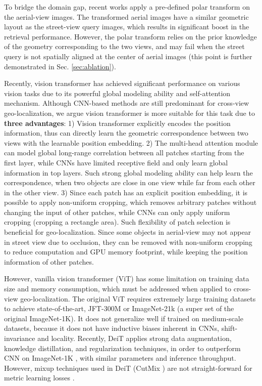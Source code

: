 \documentclass[10pt,twocolumn,letterpaper]{article}
\begin{document}
To bridge the domain gap, recent works apply a pre-defined polar transform \cite{SAFA,shi2020looking,toker2021coming} on the aerial-view images. The transformed aerial images have a similar geometric layout as the street-view query images, which results in significant boost in the retrieval performance. However, the polar transform relies on the prior knowledge of the geometry corresponding to the two views, and may fail when the street query is not spatially aligned at the center of aerial images \cite{zhu2021vigor} (this point is further demonstrated in Sec. \ref{sec:ablation}). 

Recently, vision transformer \cite{vit} has achieved significant performance on various vision tasks due to its powerful global modeling ability and self-attention mechanism. Although CNN-based methods are still predominant for cross-view geo-localization, we argue vision transformer is more suitable for this task due to \textbf{three advantages}: 1) Vision transformer explicitly encodes the position information, thus can directly learn the geometric correspondence between two views with the learnable position embedding. 2) The multi-head attention \cite{transformer} module can model global long-range correlation between all patches starting from the first layer, while CNNs have limited receptive field \cite{vit} and only learn global information in top layers. Such strong global modeling ability can help learn the correspondence, when two objects are close in one view while far from each other in the other view. 3) Since each patch has an explicit position embedding, it is possible to apply non-uniform cropping, which removes arbitrary patches without changing the input of other patches, while CNNs can only apply uniform cropping (\ie cropping a rectangle area). Such flexibility of patch selection is beneficial for geo-localization. Since some objects in aerial-view may not appear in street view due to occlusion, they can be removed with non-uniform cropping to reduce computation and GPU memory footprint, while keeping the position information of other patches.

However, vanilla vision transformer \cite{vit} (ViT) has some limitation on training data size and memory consumption, which must be addressed when applied to cross-view geo-localization. The original ViT \cite{vit} requires extremely large training datasets to achieve state-of-the-art, \eg JFT-300M \cite{vit} or ImageNet-21k \cite{deng2009imagenet} (a super set of the original ImageNet-1K). It does not generalize well if trained on medium-scale datasets, because it does not have inductive biases \cite{vit} inherent in CNNs, \eg shift-invariance and locality. Recently, DeiT \cite{deit} applies strong data augmentation, knowledge distillation,  and regularization techniques, in order to  outperform CNN on ImageNet-1K \cite{deng2009imagenet}, with similar parameters and inference throughput. However, mixup techniques used in DeiT (\eg CutMix \cite{deit,yun2019cutmix}) are not straight-forward for metric learning losses \cite{CVM}. 
\end{document}
